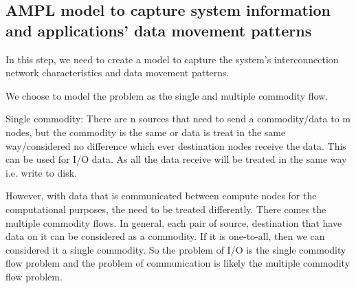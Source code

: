 \documentclass[letter]{article}
\begin{document}
\subsection {AMPL model to capture system information and applications' data movement patterns}
In this step, we need to create a model to capture the system's interconnection network characteristics and data movement patterns.

We choose to model the problem as the single and multiple commodity flow.

Single commodity: There are n sources that need to send a commodity/data to m nodes, but the commodity is the same or data is treat in the same way/considered no difference which ever destination nodes receive the data. This can be used for I/O data. As all the data receive will be treated in the same way i.e. write to disk. 

However, with data that is communicated between compute nodes for the computational purposes, the need to be treated differently. There comes the multiple commodity flows. In general, each pair of source, destination that have data on it can be considered as a commodity. If it is one-to-all, then we can considered it a single commodity. So the problem of I/O is the single commodity flow problem and the problem of communication is likely the multiple commodity flow problem.
\end{document}
